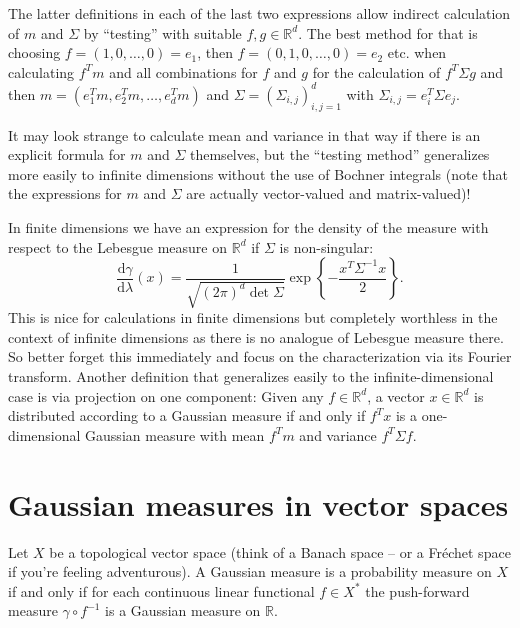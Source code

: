 \documentclass{scrartcl}
\theoremstyle{definition}
\theoremstyle{remark}
\newcommand{\de}{\mathrm d}
\newcommand{\Frechet}{Fr\'echet }
\newcommand{\R}{\mathbb R}
\begin{document}
The latter definitions in each of the last two expressions allow indirect calculation of $m$ and $\Sigma$ by ``testing'' with suitable $f,g\in \R^d$. The best method for that is choosing $f=(1,0,\ldots, 0)=e_1$, then $f = (0, 1, 0, \ldots, 0)=e_2$ etc. when calculating $f^Tm$ and all combinations for $f$ and $g$ for the calculation of $f^T\Sigma g$ and then $m = (e_1^Tm, e_2^Tm,\ldots, e_d^T m)$ and $\Sigma = (\Sigma_{i,j})_{i,j=1}^d$ with $\Sigma_{i,j} = e_i^T\Sigma e_j$. 

It may look strange to calculate mean and variance in that way if there is an explicit formula for $m$ and $\Sigma$ themselves, but the ``testing method'' generalizes more easily to infinite dimensions without the use of Bochner integrals (note that the expressions for $m$ and $\Sigma$ are actually vector-valued and matrix-valued)!

In finite dimensions we have an expression for the density of the measure with respect to the Lebesgue measure on $\R^d$ if $\Sigma$ is non-singular:
\[ \frac{\de \gamma}{\de\lambda}(x) = \frac{1}{\sqrt{(2\pi)^d \det \Sigma}}\exp\left\{- \frac{x^T\Sigma^{-1}x}{2}\right\}. \]
This is nice for calculations in finite dimensions but completely worthless in the context of infinite dimensions as there is no analogue of Lebesgue measure there. So better forget this immediately and focus on the characterization via its Fourier transform. Another definition that generalizes easily to the infinite-dimensional case is via projection on one component: Given any $f\in\R^d$, a vector $x\in\R^d$ is distributed according to a Gaussian measure if and only if $f^T x$ is a one-dimensional Gaussian measure with mean $f^Tm$ and variance $f^T\Sigma f$.
\section{Gaussian measures in vector spaces}
Let $X$ be a topological vector space (think of a Banach space -- or a \Frechet space if you're feeling adventurous). A Gaussian measure is a probability measure on $X$ if and only if for each continuous linear functional $f\in X^*$ the push-forward measure $\gamma \circ f^{-1}$ is a Gaussian measure on $\R$.
\end{document}
